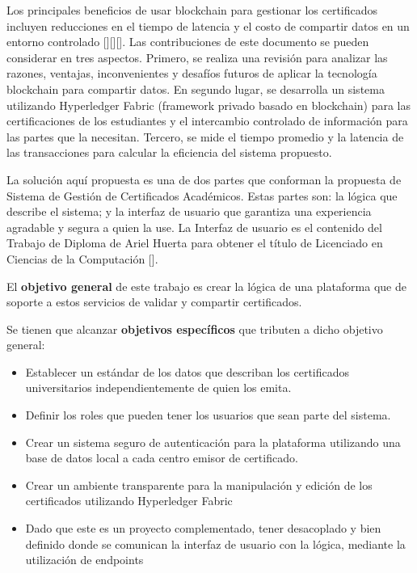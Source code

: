 Los principales beneficios de usar blockchain para gestionar los certificados incluyen reducciones en el tiempo de latencia y el costo de compartir datos en un entorno controlado [\cite{alammary2019blockchain}][\cite{azeez2021design}][\cite{aljazaery2022encryption}]. Las contribuciones de este documento se pueden considerar en tres aspectos. Primero, se realiza una revisión para analizar las razones, ventajas, inconvenientes y desafíos futuros de aplicar la tecnología blockchain para compartir datos. En segundo lugar, se desarrolla un sistema utilizando Hyperledger Fabric (framework privado basado en blockchain) para las certificaciones de los estudiantes y el intercambio controlado de información para las partes que la necesitan. Tercero, se mide el tiempo promedio y la latencia de las transacciones para calcular la eficiencia del sistema propuesto.

La solución aquí propuesta es una de dos partes que conforman la propuesta de Sistema de Gestión de Certificados Académicos. Estas partes son: la lógica que describe el sistema; y la interfaz de usuario que garantiza una experiencia agradable y segura a quien la use. La Interfaz de usuario es el contenido del Trabajo de Diploma de Ariel Huerta para obtener el título de Licenciado en Ciencias de la Computación [\cite{arie}]. 

El \textbf{objetivo general} de este trabajo es crear la lógica de una plataforma que de soporte a estos servicios de validar y compartir certificados.

Se tienen que alcanzar \textbf{objetivos específicos} que tributen a dicho objetivo general:
\begin{itemize}
	\item Establecer un estándar de los datos que describan los certificados universitarios independientemente de quien los emita.
	\item Definir los roles que pueden tener los usuarios que sean parte del sistema.
	\item Crear un sistema seguro de autenticación para la plataforma utilizando una base de datos local a cada centro emisor de certificado.
	\item Crear un ambiente transparente para la manipulación y edición de los certificados utilizando Hyperledger Fabric
	\item Dado que este es un proyecto complementado, tener desacoplado y bien definido donde se comunican la interfaz de usuario con la lógica, mediante la utilización de endpoints   
\end{itemize}

